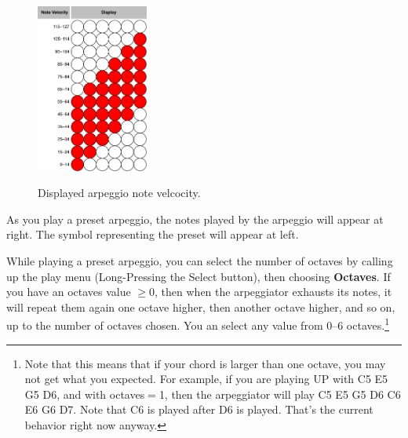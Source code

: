 \documentclass{article}
\begin{document}
\begin{figure}
\begin{center}
\vspace{-2em}
\includegraphics[width=1.45in]{arpvelocity}\\
\caption{Displayed arpeggio note velcocity.}
\end{center}
\vspace{-2em}
\label{arpvelocity}
\end{figure}

As you play a preset arpeggio, the notes played by the arpeggio will appear at right.  The symbol representing the preset will appear at left.

While playing a preset arpeggio, you can select the number of octaves by calling up the play menu (Long-Pressing the Select button), then choosing {\bf Octaves}.  If you have an octaves value \(\geq 0\), then when the arpeggiator exhausts its notes, it will repeat them again one octave higher, then another octave higher, and so on, up to the number of octaves chosen. You an select any value from 0--6 octaves.\footnote{Note that this means that if your chord is larger than one octave, you may not get what you expected.  For example, if you are playing UP with C5 E5 G5 D6, and with octaves\(=\)1, then the arpeggiator will play C5 E5 G5 D6 C6 E6 G6 D7.  Note that C6 is played after D6 is played.  That's the current behavior right now anyway.}
\end{document}
